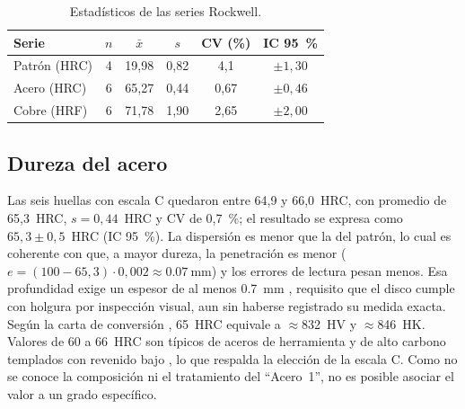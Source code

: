 \documentclass[journal,11pt]{IEEEtran}
\begin{document}
\begin{table}[!t]
\caption{Estadísticos de las series Rockwell.}
\label{tab:stats}
\centering\footnotesize
\begin{tabular}{@{}lccccc@{}}
\toprule
Serie & $n$ & $\bar{x}$ & $s$ & CV (\%) & IC 95~\%\\
\midrule
Patrón (HRC) & 4 & 19,98 & 0,82 & 4,1 & $\pm1{,}30$\\
Acero (HRC)  & 6 & 65,27 & 0,44 & 0,67 & $\pm0{,}46$\\
Cobre (HRF)  & 6 & 71,78 & 1,90 & 2,65 & $\pm2{,}00$\\
\bottomrule
\end{tabular}
\end{table}

\subsection{Dureza del acero}
Las seis huellas con escala C quedaron entre 64,9 y 66,0~HRC, con promedio de 65,3~HRC, $s=0{,}44$~HRC y CV de 0,7~\%; el resultado se expresa como $65{,}3\pm0{,}5$~HRC (IC 95~\%). La dispersión es menor que la del patrón, lo cual es coherente con que, a mayor dureza, la penetración es menor ($e=(100-65{,}3)\cdot0{,}002\approx\SI{0,07}{\milli\metre}$) y los errores de lectura pesan menos. Esa profundidad exige un espesor de al menos \SI{0,7}{\milli\metre} \cite{astm18}, requisito que el disco cumple con holgura por inspección visual, aun sin haberse registrado su medida exacta. Según la carta de conversión \cite{leco}, 65~HRC equivale a $\approx$832~HV y $\approx$846~HK. Valores de 60 a 66~HRC son típicos de aceros de herramienta y de alto carbono templados con revenido bajo \cite{asmhb}, lo que respalda la elección de la escala C. Como no se conoce la composición ni el tratamiento del ``Acero~1'', no es posible asociar el valor a un grado específico.
\end{document}
